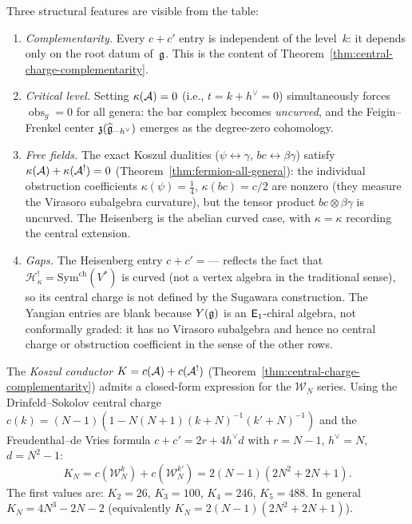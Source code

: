 \begin{remark}\label{rem:reading-master-table}
Three structural features are visible from the table:
\begin{enumerate}
\item \emph{Complementarity.}
  Every $c + c'$ entry is independent of the level~$k$: it depends
  only on the root datum of~$\mathfrak{g}$.
  This is the content of Theorem~\ref{thm:central-charge-complementarity}.
\item \emph{Critical level.}
  Setting $\kappa(\mathcal{A}) = 0$ (i.e., $t = k + h^\vee = 0$)
  simultaneously forces $\operatorname{obs}_g = 0$
  for all genera: the bar complex becomes \emph{uncurved}, and
  the Feigin--Frenkel center $\mathfrak{z}(\widehat{\mathfrak{g}}_{-h^\vee})$
  emerges as the degree-zero cohomology.
\item \emph{Free fields.}
  The exact Koszul dualities ($\psi \leftrightarrow \gamma$,
  $bc \leftrightarrow \beta\gamma$) satisfy
  $\kappa(\mathcal{A}) + \kappa(\mathcal{A}^!) = 0$
  (Theorem~\ref{thm:fermion-all-genera}): the individual
  obstruction coefficients $\kappa(\psi) = \tfrac{1}{4}$,
  $\kappa(bc) = c/2$ are nonzero (they measure the
  Virasoro subalgebra curvature), but the tensor product
  $bc \otimes \beta\gamma$ is uncurved.
  The Heisenberg is the abelian curved case, with
  $\kappa = \kappa$ recording the central extension.
\item \emph{Gaps.}
  The Heisenberg entry $c + c' = \text{---}$ reflects the fact that
  $\mathcal{H}_\kappa^! = \mathrm{Sym}^{\mathrm{ch}}(V^*)$ is
  curved (not a vertex algebra in the traditional sense), so
  its central charge is not defined by the Sugawara construction.
  The Yangian entries are blank because $Y(\mathfrak{g})$ is an $\mathsf{E}_1$-chiral
  algebra, not conformally graded: it has no Virasoro subalgebra
  and hence no central charge or obstruction coefficient in the
  sense of the other rows.
\end{enumerate}
\end{remark}

\begin{remark}\label{rem:koszul-conductor-explicit}
The \emph{Koszul conductor} $K = c(\mathcal{A}) + c(\mathcal{A}^!)$ (Theorem~\ref{thm:central-charge-complementarity}) admits a closed-form expression for the $\mathcal{W}_N$ series.  Using the Drinfeld--Sokolov central charge $c(k) = (N-1)(1 - N(N+1)(k+N)^{-1}(k'+N)^{-1})$ and the Freudenthal--de Vries formula $c + c' = 2r + 4h^\vee d$ with $r = N-1$, $h^\vee = N$, $d = N^2-1$:
\[
K_N = c(\mathcal{W}_N^k) + c(\mathcal{W}_N^{k'}) = 2(N-1)(2N^2 + 2N + 1).
\]
The first values are: $K_2 = 26$, $K_3 = 100$, $K_4 = 246$, $K_5 = 488$.  In general $K_N = 4N^3 - 2N - 2$ (equivalently $K_N = 2(N-1)(2N^2+2N+1)$).
\end{remark}

